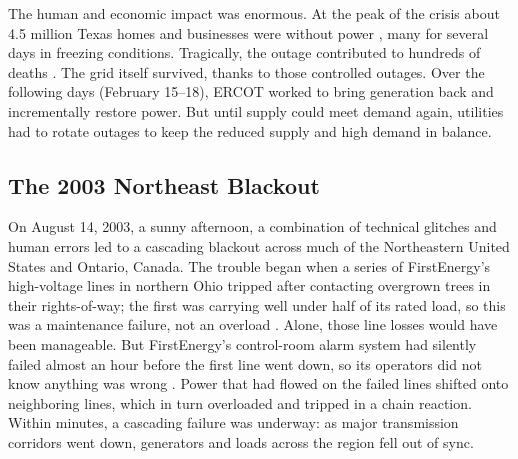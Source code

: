 The human and economic impact was enormous. At the peak of the crisis about 4.5 million Texas homes and businesses were without power \autocite{CascadingRisks2021}, many for several days in freezing conditions. Tragically, the outage contributed to hundreds of deaths \autocite{DSHSWinterStormMortality2021}. The grid itself survived, thanks to those controlled outages. Over the following days (February 15--18), ERCOT worked to bring generation back and incrementally restore power. But until supply could meet demand again, utilities had to rotate outages to keep the reduced supply and high demand in balance.

\subsection{The 2003 Northeast Blackout}

On August 14, 2003, a sunny afternoon, a combination of technical glitches and human errors led to a cascading blackout across much of the Northeastern United States and Ontario, Canada. The trouble began when a series of FirstEnergy's high-voltage lines in northern Ohio tripped after contacting overgrown trees in their rights-of-way; the first was carrying well under half of its rated load, so this was a maintenance failure, not an overload \autocite{OutageTaskForce2004}. %
Alone, those line losses would have been manageable. But FirstEnergy's control-room alarm system had silently failed almost an hour before the first line went down, so its operators did not know anything was wrong \autocite{OutageTaskForce2004}. %
Power that had flowed on the failed lines shifted onto neighboring lines, which in turn overloaded and tripped in a chain reaction. Within minutes, a cascading failure was underway: as major transmission corridors went down, generators and loads across the region fell out of sync.

